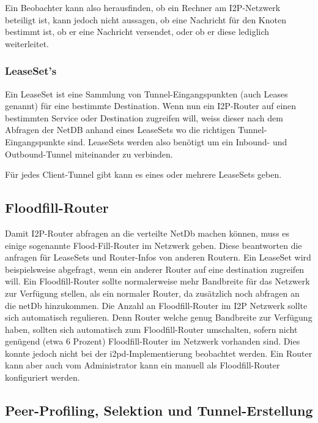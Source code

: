 Ein Beobachter kann also herausfinden, ob ein Rechner am I2P-Netzwerk beteiligt ist, kann jedoch nicht aussagen, ob eine Nachricht für den Knoten bestimmt ist, ob er eine Nachricht versendet, oder ob er diese lediglich weiterleitet.

\subsubsection{LeaseSet's}

Ein LeaseSet ist eine Sammlung von Tunnel-Eingangspunkten (auch Leases genannt) für eine bestimmte Destination.
Wenn nun ein I2P-Router auf einen bestimmten Service oder Destination zugreifen will, weiss dieser nach dem Abfragen der NetDB anhand eines LeaseSets
wo die richtigen Tunnel-Eingangspunkte sind.
LeaseSets werden also benötigt um ein Inbound- und Outbound-Tunnel miteinander zu verbinden.

Für jedes Client-Tunnel gibt kann es eines oder mehrere LeaseSets geben.

\subsection{Floodfill-Router}

Damit I2P-Router abfragen an die verteilte NetDb machen können, muss es einige sogenannte Flood-Fill-Router im Netzwerk geben.
Diese beantworten die anfragen für LeaseSets und Router-Infos von anderen Routern.
Ein LeaseSet wird beispielsweise abgefragt, wenn ein anderer Router auf eine destination zugreifen will.
Ein Floodfill-Router sollte normalerweise mehr Bandbreite für das Netzwerk zur Verfügung stellen, als ein normaler Router, da zusätzlich noch abfragen an die netDb hinzukommen.
Die Anzahl an Floodfill-Router im I2P Netzwerk sollte sich automatisch regulieren.
Denn Router welche genug Bandbreite zur Verfügung haben, sollten sich automatisch zum Floodfill-Router umschalten, sofern nicht genügend (etwa 6 Prozent) Floodfill-Router im Netzwerk vorhanden sind.
Dies konnte jedoch nicht bei der i2pd-Implementierung beobachtet werden.
Ein Router kann aber auch vom Administrator kann ein manuell als Floodfill-Router konfiguriert werden.
\parencite[S.~5-6]{timpanaro_monitoring_nodate}

\subsection{Peer-Profiling, Selektion und Tunnel-Erstellung}\label{sec:tunnelerstellung}

